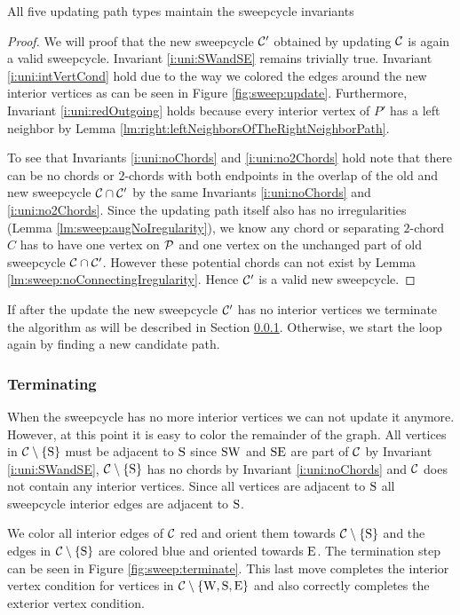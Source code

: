   \begin{lemma}
    \label{lm:sweep:updateMaintainsInvariants}
    All five updating path types maintain the sweepcycle invariants
  \end{lemma}
  \begin{proof}
    We will proof that the new sweepcycle $\C'$ obtained by updating $\C$ is again a valid sweepcycle. Invariant \ref{i:uni:SWandSE} remains trivially true. Invariant \ref{i:uni:intVertCond} hold due to the way we colored the edges around the new interior vertices as can be seen in Figure \ref{fig:sweep:update}.
    Furthermore, Invariant \ref{i:uni:redOutgoing} holds because every interior vertex of $P'$ has a left neighbor by Lemma \ref{lm:right:leftNeighborsOfTheRightNeighborPath}.

    To see that Invariants \ref{i:uni:noChords} and \ref{i:uni:no2Chords} hold note that there can be no chords or $2$-chords with both endpoints in the overlap of the old and new sweepcycle $\C \cap \C'$ by the same Invariants \ref{i:uni:noChords} and \ref{i:uni:no2Chords}. Since the updating path itself also has no irregularities (Lemma \ref{lm:sweep:augNoIregularity}),
    we know any chord or separating $2$-chord $C$ has to have one vertex on $\P$ and one vertex on the unchanged part of old sweepcycle $\C \cap \C'$.
    However these potential chords can not exist by Lemma \ref{lm:sweep:noConnectingIregularity}.
    Hence $\C'$ is a valid new sweepcycle.
  \end{proof}

  If after the update the new sweepcycle $\C'$ has no interior vertices we terminate the algorithm as will be described in Section \ref{sss:terminating}. Otherwise, we start the loop again by finding a new candidate path.

\subsubsection{Terminating}
  \label{sss:terminating}
  When the sweepcycle has no more interior vertices we can not update it anymore.
  However, at this point it is easy to color the remainder of the graph.
  All vertices in $\cpath$ must be adjacent to $\pS$ since $\pS \pW$ and $\pS \pE$ are part of $\C$ by Invariant \ref{i:uni:SWandSE}, $\cpath$ has no chords by Invariant \ref{i:uni:noChords} and $\C$ does not contain any interior vertices. Since all vertices are adjacent to $\pS$ all sweepcycle interior edges are adjacent to $\pS$.

  We color all interior edges of $\C$ red and orient them towards $\cpath$ and the edges in $\cpath$ are colored blue and oriented towards $\pE$. The termination step can be seen in Figure \ref{fig:sweep:terminate}. This last move completes the interior vertex condition for vertices in $\C \sm {\pW, \pS, \pE}$ and also correctly completes the exterior vertex condition.


